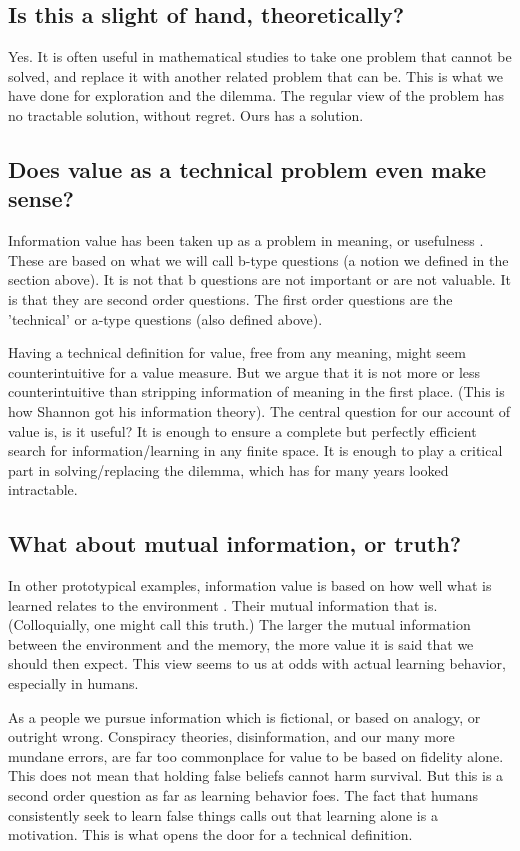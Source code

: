 \subsection*{Is this a slight of hand, theoretically?}
Yes. It is often useful in mathematical studies to take one problem that cannot be solved, and replace it with another related problem that can be. This is what we have done for exploration and the dilemma. The regular view of the problem has no tractable solution, without regret. Ours has a solution.


\subsection*{Does value as a technical problem even make sense?}
Information value has been taken up as a problem in meaning, or usefulness \cite{needed}. These are based on what we will call b-type questions (a notion we defined in the section above). It is not that b questions are not important or are not valuable. It is that they are second order questions. The first order questions are the 'technical' or a-type questions (also defined above). 

Having a technical definition for value, free from any meaning, might seem counterintuitive for a value measure. But we argue that it is not more or less counterintuitive than stripping information of meaning in the first  place. (This is how Shannon got his information theory). The central question for our account of value is, is it useful? It is enough to ensure a complete but perfectly efficient search for information/learning in any finite space. It is enough to play a critical part in solving/replacing the dilemma, which has for many years looked intractable. 


\subsection*{What about mutual information, or truth?}
In other prototypical examples, information value is based on how well what is learned relates to the environment \cite{needed}. Their mutual information that is. (Colloquially, one might call this truth.) The larger the mutual information between the environment and the memory, the more value it is said that we should then expect. This view seems to us at odds with actual learning behavior, especially in humans. 

As a people we pursue information which is fictional, or based on analogy, or outright wrong. Conspiracy theories, disinformation, and our many more mundane errors, are far too commonplace for value to be based on fidelity alone. This does not mean that holding false beliefs cannot harm survival. But this is a second order question as far as learning behavior foes. The fact that humans consistently seek to learn false things calls out that learning alone is a motivation. This is what opens the door for a technical definition.


